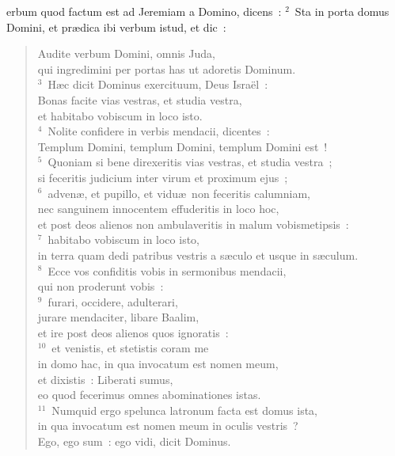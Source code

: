 \bchapter
{}erbum quod factum est ad Jeremiam a Domino, dicens~:
${}^{2}$~Sta in porta domus Domini, et pr\ae dica ibi verbum istud, et dic~: \begin{flushleft}\begin{verse}Audite verbum Domini, omnis Juda,\\ qui ingredimini per portas has ut adoretis Dominum.\\
${}^{3}$~H\ae c dicit Dominus exercituum, Deus Isra\"el~:\\ Bonas facite vias vestras, et studia vestra,\\ et habitabo vobiscum in loco isto.\\
${}^{4}$~Nolite confidere in verbis mendacii, dicentes~:\\ Templum Domini, templum Domini, templum Domini est~!\\
${}^{5}$~Quoniam si bene direxeritis vias vestras, et studia vestra~;\\ si feceritis judicium inter virum et proximum ejus~;\\
${}^{6}$~adven\ae , et pupillo, et vidu\ae\ non feceritis calumniam,\\ nec sanguinem innocentem effuderitis in loco hoc,\\ et post deos alienos non ambulaveritis in malum vobismetipsis~:\\
${}^{7}$~habitabo vobiscum in loco isto,\\ in terra quam dedi patribus vestris a s\ae culo et usque in s\ae culum.\\
${}^{8}$~Ecce vos confiditis vobis in sermonibus mendacii,\\ qui non proderunt vobis~:\\
${}^{9}$~furari, occidere, adulterari,\\ jurare mendaciter, libare Baalim,\\ et ire post deos alienos quos ignoratis~:\\
${}^{10}$~et venistis, et stetistis coram me\\ in domo hac, in qua invocatum est nomen meum,\\ et dixistis~: Liberati sumus,\\ eo quod fecerimus omnes abominationes istas.\\
${}^{11}$~Numquid ergo spelunca latronum facta est domus ista,\\ in qua invocatum est nomen meum in oculis vestris~?\\ Ego, ego sum~: ego vidi, dicit Dominus.\\

\end{verse}
\end{flushleft}
